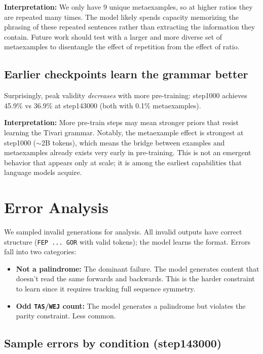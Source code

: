 \documentclass[11pt]{article}
\begin{document}
\textbf{Interpretation:} We only have 9 unique metaexamples, so at higher ratios they are repeated many times. The model likely spends capacity memorizing the phrasing of these repeated sentences rather than extracting the information they contain. Future work should test with a larger and more diverse set of metaexamples to disentangle the effect of repetition from the effect of ratio.

\subsection{Earlier checkpoints learn the grammar better}

Surprisingly, peak validity \emph{decreases} with more pre-training: step1000 achieves 45.9\% vs 36.9\% at step143000 (both with 0.1\% metaexamples).

\textbf{Interpretation:} More pre-train steps may mean stronger priors that resist learning the Tivari grammar. Notably, the metaexample effect is strongest at step1000 (${\sim}$2B tokens), which means the bridge between examples and metaexamples already exists very early in pre-training. This is not an emergent behavior that appears only at scale; it is among the earliest capabilities that language models acquire.

\section{Error Analysis}

We sampled invalid generations for analysis. All invalid outputs have correct structure (\texttt{FEP ... GOR} with valid tokens); the model learns the format. Errors fall into two categories:

\begin{itemize}
    \item \textbf{Not a palindrome:} The dominant failure. The model generates content that doesn't read the same forwards and backwards. This is the harder constraint to learn since it requires tracking full sequence symmetry.
    \item \textbf{Odd \texttt{TAS}/\texttt{WEJ} count:} The model generates a palindrome but violates the parity constraint. Less common.
\end{itemize}

\subsection{Sample errors by condition (step143000)}
\end{document}
